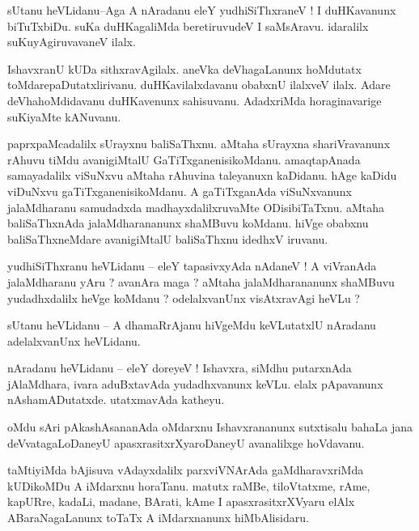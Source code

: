 \documentclass{article}
\begin{document}
\begin{mn}%
sUtanu heVLidanu--Aga A nAradanu eleY yudhiSiThxraneV ! I duHKavanunx biTuTxbiDu. suKa 
duHKagaliMda beretiruvudeV I saMsAravu. idaralilx suKuyAgiruvavaneV ilalx.
\end{mn}

\begin{mn}%
IshavxranU kUDa sithxravAgilalx. aneVka deVhagaLanunx hoMdutatx toMdarepaDutatxlirivanu. 
duHKavilalxdavanu obabxnU ilalxveV ilalx. Adare deVhahoMdidavanu duHKavenunx sahisuvanu. 
AdadxriMda horaginavarige suKiyaMte kANuvanu.
\end{mn}

\begin{mn}%
paprxpaMcadalilx sUrayxnu baliSaThxnu. aMtaha sUrayxna shariVravanunx rAhuvu tiMdu 
avanigiMtalU GaTiTxganenisikoMdanu. amaqtapAnada samayadalilx viSuNxvu aMtaha rAhuvina 
taleyanuxn kaDidanu. hAge kaDidu viDuNxvu gaTiTxganenisikoMdanu. A gaTiTxganAda 
viSuNxvanunx jalaMdharanu samudadxda madhayxdalilxruvaMte ODisibiTaTxnu. aMtaha 
baliSaThxnAda jalaMdharananunx shaMBuvu koMdanu. hiVge obabxnu baliSaThxneMdare 
avanigiMtalU baliSaThxnu idedhxV iruvanu.
\end{mn}

\begin{mn}%
yudhiSiThxranu heVLidanu -- eleY tapasivxyAda nAdaneV ! A viVranAda jalaMdharanu yAru ? 
avanAra maga ? aMtaha jalaMdharananunx shaMBuvu yudadhxdalilx heVge koMdanu ? odelalxvanUnx 
visAtxravAgi heVLu ?
\end{mn}

\begin{mn}%
sUtanu heVLidanu -- A dhamaRrAjanu hiVgeMdu keVLutatxlU nAradanu adelalxvanUnx heVLidanu.
\end{mn}

\begin{mn}%
nAradanu heVLidanu -- eleY doreyeV ! Ishavxra, siMdhu putarxnAda jAlaMdhara, ivara 
aduBxtavAda yudadhxvanunx keVLu. elalx pApavanunx nAshamADutatxde. utatxmavAda katheyu.
\end{mn}

\begin{mn}%
oMdu sAri pAkashAsananAda oMdarxnu Ishavxrananunx sutxtisalu bahaLa jana deVvatagaLoDaneyU 
apasxrasitxrXyaroDaneyU avanalilxge hoVdavanu.
\end{mn}

\begin{mn}%
taMtiyiMda bAjisuva vAdayxdalilx parxviVNArAda gaMdharavxriMda kUDikoMDu A iMdarxnu 
horaTanu. matutx raMBe, tiloVtatxme, rAme, kapURre, kadaLi, madane, BArati, kAme I 
apasxrasitxrXVyaru elAlx ABaraNagaLanunx toTaTx A iMdarxnanunx hiMbAlisidaru.
\end{mn}
\end{document}
